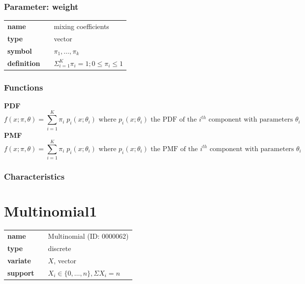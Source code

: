 \subsubsection*{Parameter: weight}

\noindent\begin{tabular}{p{2cm}cl}
\textbf{name} & & mixing coefficients \\
\textbf{type} & & vector \\
\textbf{symbol} & & $\pi_1, \ldots, \pi_k$  \\
\textbf{definition} & & $\Sigma_{i=1}^K \pi_i=1; 0\le \pi_i \le 1$
\end{tabular}
\subsubsection*{Functions}

\smallskip \noindent \hspace{.2cm} \textbf{PDF} 
\begin{equation*}f(x; \pi, \theta) = \sum_{i=1}^{K} \pi_{i}\; p_i(x; \theta_i) \text{ where } p_i(x; \theta_i) \text{ the PDF of the } i^{th} \text{ component with parameters } \theta_i\end{equation*}
\smallskip \noindent \hspace{.2cm} \textbf{PMF} 
\begin{equation*}f(x; \pi, \theta) = \sum_{i=1}^{K} \pi_{i}\; p_i(x; \theta_i) \text{ where } p_i(x; \theta_i) \text{ the PMF of the } i^{th} \text{ component with parameters } \theta_i\end{equation*}
\smallskip
\subsubsection*{Characteristics}
\smallskip
\section*{Multinomial1} 

  \bigskip 

\begin{tabular}{p{2cm}cl}
\textbf{name} & & Multinomial (ID: 0000062)\\ 
 
\textbf{type} & & discrete \\ 

\textbf{variate} & & $X$, vector \\ 

\textbf{support} & & $X_i \in \{0,\dots,n\}, \Sigma X_i = n$
\end{tabular}

